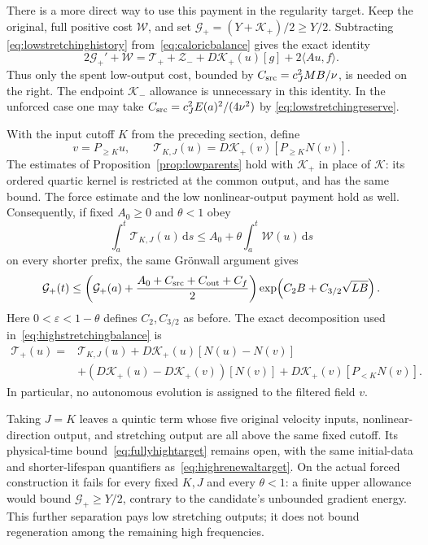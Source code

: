 \documentclass[11pt]{article}
\newcommand{\dd}{\,\mathrm d}
\begin{document}
There is a more direct way to use this payment in the regularity target.
Keep the original, full positive cost $\mathcal W$, and set
$\mathcal G_+=(Y+\mathcal K_+)/2\geq Y/2$. Subtracting
\eqref{eq:lowstretchinghistory} from~\eqref{eq:caloricbalance} gives
the exact identity
\begin{equation}\label{eq:highstretchingbalance}
 2\mathcal G_+'+\mathcal W
 =\mathcal T_++\mathcal Z_-+D\mathcal K_+(u)[g]+2\langle Au,f\rangle.
\end{equation}
Thus only the spent low-output cost, bounded by
$C_{\rm src}=c_J^2MB/\nu$, is needed on the right. The endpoint
$\mathcal K_-$ allowance is unnecessary in this identity. In the unforced
case one may take $C_{\rm src}=c_J^2E(a)^2/(4\nu^2)$ by
\eqref{eq:lowstretchingreserve}.

With the input cutoff $K$ from the preceding section, define
\[
 v=P_{\geq K}u,\qquad
 \mathcal T_{K,J}(u)=D\mathcal K_+(v)[P_{\geq K}N(v)].
\]
The estimates of Proposition~\ref{prop:lowparents} hold with
$\mathcal K_+$ in place of $\mathcal K$: its ordered quartic kernel
is restricted at the common output, and has the same bound.
The force estimate and the low nonlinear-output payment hold as well.
Consequently, if fixed $A_0\geq0$ and $\theta<1$ obey
\begin{equation}\label{eq:fullyhightarget}
 \int_a^t\mathcal T_{K,J}(u)\dd s
          \leq A_0+\theta\int_a^t\mathcal W(u)\dd s
\end{equation}
on every shorter prefix, the same Gr\"onwall argument gives
\[
 \mathcal G_+(t)\leq
 \left(\mathcal G_+(a)+\frac{A_0+C_{\rm src}+C_{\rm out}+C_f}{2}\right)
       \exp\!\left(C_2B+C_{3/2}\sqrt{LB}\right).
\]
Here $0<\varepsilon<1-\theta$ defines $C_2,C_{3/2}$ as before. The
exact decomposition used in~\eqref{eq:highstretchingbalance} is
\begin{align*}
 \mathcal T_+(u)={}&\mathcal T_{K,J}(u)
       +D\mathcal K_+(u)[N(u)-N(v)]\\
 &+(D\mathcal K_+(u)-D\mathcal K_+(v))[N(v)]
       +D\mathcal K_+(v)[P_{<K}N(v)].
\end{align*}
In particular, no autonomous evolution is assigned to the filtered field $v$.

Taking $J=K$ leaves a quintic term whose five original velocity inputs,
nonlinear-direction output, and stretching output are all above the
same fixed cutoff. Its physical-time bound~\eqref{eq:fullyhightarget}
remains open, with the same initial-data and shorter-lifespan quantifiers
as~\eqref{eq:highrenewaltarget}. On the actual forced construction it
fails for every fixed $K,J$ and every $\theta<1$: a finite upper allowance
would bound $\mathcal G_+\geq Y/2$, contrary to the candidate's unbounded
gradient energy. This further separation pays low stretching outputs;
it does not bound regeneration among the remaining high frequencies.
\end{document}
